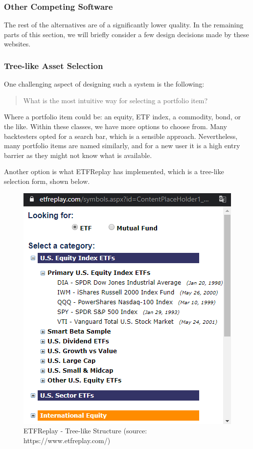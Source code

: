 \documentclass[main.tex]{subfiles}
\begin{document}
\subsubsection{Other Competing Software}

The rest of the alternatives are of a significantly lower quality. In the remaining parts of this section, we will briefly consider a few design decisions made by these websites.

\subsubsection*{Tree-like Asset Selection}

One challenging aspect of designing such a system is the following: 

\begin{quote}
    What is the most intuitive way for selecting a portfolio item? 
\end{quote}

Where a portfolio item could be: an equity, ETF index, a commodity, bond, or the like. Within these classes, we have more options to choose from. Many backtesters opted for a search bar, which is a sensible approach. Nevertheless, many portfolio items are named similarly, and for a new user it is a high entry barrier as they might not know what is available. 

Another option is what ETFReplay \cite{etfreplay} has implemented, which is a tree-like selection form, shown below. 

\begin{figure}[H]
   \centering
   \includegraphics[scale=0.7]{02Background/02Pictures/etfreplay.png}
   \caption{ETFReplay - Tree-like Structure (source: https://www.etfreplay.com/)}
\end{figure}
\end{document}
